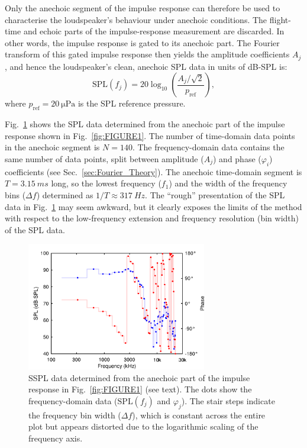 \documentclass[12pt,a4paper]{article}
\providecommand{\secn}[1]{Sec.~\ref{sec:#1}}
\providecommand{\figlabel}[1]{\label{fig:#1}}
\providecommand{\figr}[1]{Fig.~\ref{fig:#1}}
\providecommand{\pRef}{p_\mathrm{ref}}
\begin{document}
Only the anechoic segment of the impulse response can therefore be used to characterise the loudspeaker’s behaviour under anechoic conditions. The flight-time and echoic parts of the impulse-response measurement are discarded. In other words, the impulse response is gated to its anechoic part. The Fourier transform of this gated impulse response then yields the amplitude coefficients $A_j$, and hence the loudspeaker’s clean, anechoic SPL data in units of dB-SPL is:
\[
\mathrm{SPL}(f_j) = 20 \log_{10}\left( \frac{A_j / \sqrt{2}}{\pRef} \right),
\]
where $\pRef = \SI{20}{\micro\pascal}$ is the SPL reference pressure.

\figr{FIGURE2} shows the SPL data determined from the anechoic part of the impulse response shown in \figr{FIGURE1}. The number of time-domain data points in the anechoic segment is $N = 140$. The frequency-domain data contains the same number of data points, split between amplitude ($A_j$) and phase ($\varphi_i$) coefficients (see \secn{Fourier_Theory}). The anechoic time-domain segment is $T = \SI{3.15}{ms}$ long, so the lowest frequency ($f_1$) and the width of the frequency bins ($\Delta f$) determined as $1/T \approx \SI{317}{Hz}$. The ``rough'' presentation of the SPL data in \figr{FIGURE2} may seem awkward, but it clearly exposes the limits of the method with respect to the low-frequency extension and frequency resolution (bin width) of the SPL data.

\begin{figure}[tbp]
  \begin{center}
    \includegraphics[width=0.7\textwidth]{FIGURE2}
    \caption{SSPL data determined from the anechoic part of the impulse response in \figr{FIGURE1} (see text). The dots show the frequency-domain data ($\mathrm{SPL}(f_j)$ and $\varphi_j$). The stair steps indicate the frequency bin width ($\Delta f$), which is constant across the entire plot but appears distorted due to the logarithmic scaling of the frequency axis.}
    \figlabel{FIGURE2}
  \end{center}
\end{figure}
\end{document}
